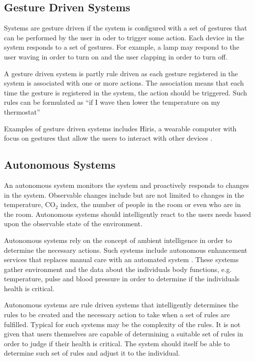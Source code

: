 \subsection{Gesture Driven Systems}

Systems are gesture driven if the system is configured with a set of gestures that can be performed by the user in oder to trigger some action. 
Each device in the system responds to a set of gestures. 
For example, a lamp may respond to the user waving in order to turn on and the user clapping in order to turn off.

A gesture driven system is partly rule driven as each gesture registered in the system is associated with one or more actions. 
The association means that each time the gesture is registered in the system, the action should be triggered. 
Such rules can be formulated as ``if I wave then lower the temperature on my thermostat''

Examples of gesture driven systems includes Hiris, a wearable computer with focus on gestures that allow the users to interact with other devices \cite{hirisweb}.

\subsection{Autonomous Systems}

An autonomous system monitors the system and proactively responds to changes in the system. 
Observable changes include but are not limited to changes in the temperature, CO$_2$ index, the number of people in the room or even who are in the room.
Autonomous systems should intelligently react to the users needs based upon the observable state of the environment.

Autonomous systems rely on the concept of ambient intelligence in order to determine the necessary actions. 
Such systems include autonomous enhancement services that replaces manual care with an automated system \cite{nehmer2006living}. 
These systems gather environment and the data about the individuals body functions, 
e.g. temperature, pulse and blood pressure in order to determine if the individuals health is critical.

Autonomous systems are rule driven systems that intelligently determines the rules to be created and the necessary action to take when a set of rules are fulfilled. 
Typical for such systems may be the complexity of the rules. 
It is not given that users themselves are capable of determining a suitable set of rules in order to judge if their health is critical. 
The system should itself be able to determine such set of rules and adjust it to the individual.

